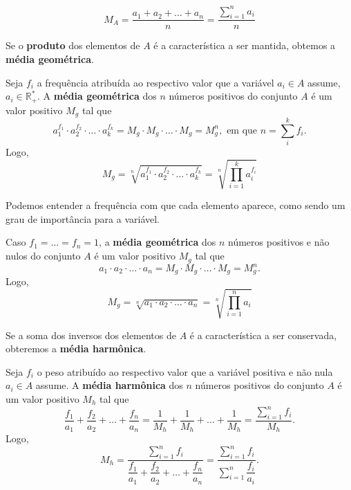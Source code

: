 {\begin{equation}\label{ma}
M_A = \dfrac{a_1 + a_2 + \ldots + a_n}{n} = \dfrac{\displaystyle \sum_{i=1}^{n} a_i}{n}
\end{equation}


Se o \textbf{produto} dos elementos de \(A\) é a característica a ser mantida, obtemos a \textbf{média geométrica}.

Seja \(f_i\) a frequência atribuída ao respectivo valor que a variável \(a_i \in A\) assume, \(a_i \in \mathbb{R}_+^\ast\). A \textbf{média geométrica} dos \(n\) números positivos do conjunto \(A\) é um valor positivo \(M_g\) tal que
\[a_1^{f_1} \cdot a_2^{f_2} \cdot \ldots \cdot a_k^{f_k} = M_g \cdot M_g \cdot \ldots \cdot M_g = M_g^n, \mbox{ em que } n = \displaystyle \sum_i^k f_i.\]
Logo,
\begin{equation}\label{mgp}
M_g = \sqrt[n]{a_1^{f_1} \cdot a_2^{f_2} \cdot \ldots \cdot a_k^{f_k}} = \sqrt[n]{\prod_{i=1}^{k} a_i^{f_i}}
\end{equation}

Podemos entender a frequência com que cada elemento aparece, como sendo um grau de importância para a variável.

Caso \(f_1= \ldots = f_n = 1\), a \textbf{média geométrica} dos \(n\) números positivos e não nulos do conjunto \(A\) é um valor positivo \(M_g\) tal que
$$a_1 \cdot a_2 \cdot \ldots \cdot a_n = M_g \cdot M_g \cdot \ldots \cdot M_g = M_g^n.$$
Logo,
\begin{equation}
M_g = \sqrt[n]{a_1 \cdot a_2 \cdot \ldots \cdot a_n} = \sqrt[n]{\prod_{i=1}^{n} a_i}
\end{equation}


Se a soma dos inversos dos elementos de \(A\) é a característica a ser conservada, obteremos a \textbf{média harmônica}.

Seja \(f_i\) o peso atribuído ao respectivo valor que a variável positiva e não nula \(a_i \in A\) assume. A \textbf{média harmônica} dos \(n\) números positivos do conjunto \(A\) é um valor positivo \(M_h\) tal que
\[\dfrac{f_1}{a_1} + \dfrac{f_2}{a_2} + \ldots + \dfrac{f_n}{a_n} = \dfrac{1}{M_h} + \dfrac{1}{M_h} + \ldots + \dfrac{1}{M_h} = \dfrac{\displaystyle \sum_{i=1}^{n} f_i}{M_h}.\]
Logo,
\begin{equation}
M_h = \dfrac{\displaystyle \sum_{i=1}^{n} f_i}{\dfrac{f_1}{a_1} + \dfrac{f_2}{a_2} + \ldots + \dfrac{f_n}{a_n}} = \dfrac{\displaystyle \sum_{i=1}^{n} f_i}{\displaystyle \sum_{i=1}^{n} \dfrac{f_i}{a_i}}.
\end{equation}


}
